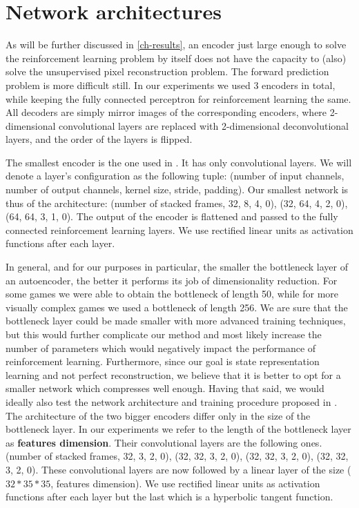 \section{Network architectures}
\label{sec-net-arch}
As will be further discussed in \ref{ch-results},
an encoder just large enough to solve the reinforcement learning problem
by itself does not have the capacity to (also) solve the unsupervised pixel reconstruction
problem.
The forward prediction problem is more difficult still.
In our experiments we used 3 encoders in total, while keeping the fully connected perceptron
for reinforcement learning the same.
All decoders are simply mirror images of the corresponding encoders, where
2-dimensional convolutional layers are replaced with 2-dimensional deconvolutional layers,
and the order of the layers is flipped.

The smallest encoder is the one used in \cite{mnih2015humanlevel}.
It has only convolutional layers.
We will denote a layer's configuration as the following tuple:
(number of input channels, number of output
channels, kernel size, stride, padding).
Our smallest network is thus of the architecture:
(number of stacked frames, 32, 8, 4, 0), (32, 64, 4, 2, 0), (64, 64, 3, 1, 0).
The output of the encoder is flattened and passed to the fully connected reinforcement learning
layers. We use rectified linear units as activation functions after each layer.

In general, and for our purposes in particular, the smaller the bottleneck layer
of an autoencoder, the better it performs its job of dimensionality reduction.
For some games we were able to obtain the bottleneck of length 50, while for more visually 
complex games we used a bottleneck of length 256.
We are sure that the bottleneck layer could be made smaller with more advanced training
techniques, but this would further complicate our method and most likely 
increase the number of parameters which would negatively impact the performance of
reinforcement learning.
Furthermore, since our goal is state representation learning and not perfect reconstruction,
we believe that it is better to opt for a smaller network which compresses well enough.
Having that said, we would ideally also test the network architecture and
training procedure proposed in \cite{oh2015action}.
The architecture of the two bigger encoders differ only in the size of the bottleneck layer.
In our experiments we refer to the length of the bottleneck layer
as \textbf{features dimension}.
Their convolutional layers are the following ones. 
(number of stacked frames, 32, 3, 2, 0), 
(32, 32, 3, 2, 0),
(32, 32, 3, 2, 0),
(32, 32, 3, 2, 0).
These convolutional layers are now followed by a linear layer of the size
($32 * 35 * 35$, features dimension).
We use rectified linear units as activation functions after each layer but the last
which is a hyperbolic tangent function.

